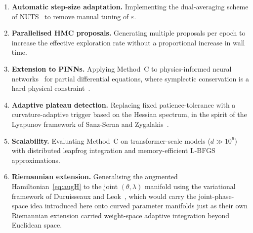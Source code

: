 \documentclass[11pt]{article}
\theoremstyle{definition}
\begin{document}
\begin{enumerate}[leftmargin=*,label=\arabic*.]

  \item \textbf{Automatic step-size adaptation.} Implementing the
        dual-averaging scheme of NUTS~\cite{hoffman2014nuts} to
        remove manual tuning of $\varepsilon$.

  \item \textbf{Parallelised HMC proposals.} Generating multiple
        proposals per epoch to increase the effective exploration
        rate without a proportional increase in wall time.

  \item \textbf{Extension to PINNs.} Applying Method~C to
        physics-informed neural
        networks~\cite{raissi2019pinns,krishnapriyan2021,wang2023}
        for partial differential equations, where symplectic
        conservation is a hard physical constraint~\cite{kiyani2025}.

  \item \textbf{Adaptive plateau detection.} Replacing fixed
        patience-tolerance with a curvature-adaptive trigger based
        on the Hessian spectrum, in the spirit of the Lyapunov
        framework of Sanz-Serna and
        Zygalakis~\cite{sanzserna2021lyapunov,dobson2025connections}.

  \item \textbf{Scalability.} Evaluating Method~C on transformer-scale
        models ($d\gg10^6$) with distributed leapfrog integration and
        memory-efficient L-BFGS approximations.

  \item \textbf{Riemannian extension.} Generalising the augmented
        Hamiltonian~\eqref{eq:augH} to the joint $(\theta,\lambda)$
        manifold using the variational framework of Duruisseaux and
        Leok~\cite{duruisseaux2022variational}, which would carry
        the joint-phase-space idea introduced here onto curved
        parameter manifolds just as their own Riemannian extension
        carried weight-space adaptive integration beyond Euclidean
        space.

\end{enumerate}

\end{document}
